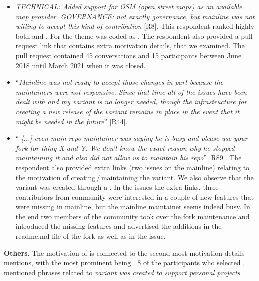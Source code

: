 \begin{itemize}[leftmargin=*]
\item \emph{TECHNICAL: Added support for OSM (open street maps) as an available map provider. GOVERNANCE: not exactly governance, but mainline was not willing to accept this kind of contribution} [R8]. This respondent ranked highly both  and . For  the theme was coded as . The respondent also provided a \gh pull request link that contains extra motivation details, that we examined. The pull request contained 45 conversations and 15 participants between June 2018 until March 2021 when it was closed.

\item ``\emph{Mainline was not ready to accept those changes in part because the maintainers were not responsive. Since that time all of the issues have been dealt with and my variant is no longer needed, though the infrastructure for creating a new release of the variant remains in place in the event that it might be needed in the future}'' [R44].

\item ``\emph{%
[...] even main repo maintainer was saying he is busy and please use your fork for thing X and Y. We don't know the exact reason why he stopped maintaining it and also did not allow us to maintain his repo}'' [R89]. The respondent also provided extra links (two issues on the mainline) relating to the motivation of creating\,/\,maintaining the variant. We also observe that the variant was created through a .
In the issues the extra links, three contributors from community were interested in a couple of new features that were missing in mainline, but the mainline maintainer seems indeed busy. In the end two members of the community took over the fork maintenance and introduced the missing features and advertised the additions in the \textsf{readme.md} file of the fork as well as in the issue.

\end{itemize}


\nd \textbf{Others}. The motivation of  is connected to the second most motivation details mentions, with the most prominent being . 8 of the participants who selected , mentioned phrases related to \emph{variant was created to support personal projects}.


